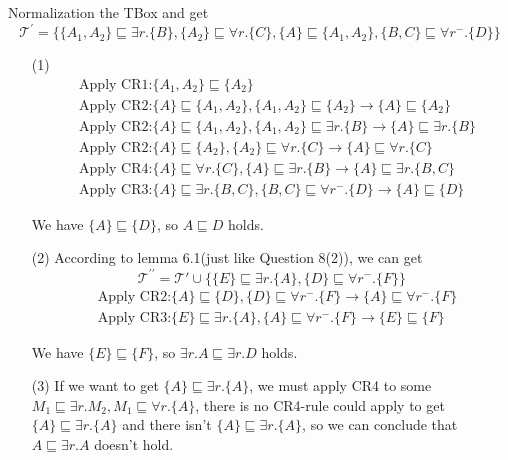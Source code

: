 \documentclass[12pt]{article}
\def \T {\mathcal{T}}
\begin{document}
    Normalization the TBox and get $$\T^{\prime} = \{\{A_1,A_2\}\sqsubseteq \exists r.\{B\},\{A_2\}\sqsubseteq \forall r.\{C\},\{A\} \sqsubseteq\{A_1,A_2\},\{B,C\}\sqsubseteq \forall r^{-}.\{D\}\}$$
    \begin{enumerate}
        \item [(1)]
        \begin{align*}
            &\text{Apply CR1:}\{A_1,A_2\}\sqsubseteq\{A_2\} \\
            &\text{Apply CR2:}\{A\}\sqsubseteq\{A_1,A_2\},\{A_1,A_2\}\sqsubseteq\{A_2\}\to\{A\}\sqsubseteq\{A_2\} \\
            &\text{Apply CR2:}\{A\}\sqsubseteq\{A_1,A_2\},\{A_1,A_2\}\sqsubseteq\exists r.\{B\}\to\{A\}\sqsubseteq\exists r.\{B\} \\
            &\text{Apply CR2:}\{A\}\sqsubseteq\{A_2\},\{A_2\}\sqsubseteq\forall r.\{C\}\to\{A\}\sqsubseteq\forall r.\{C\} \\
            &\text{Apply CR4:}\{A\}\sqsubseteq\forall r.\{C\},\{A\}\sqsubseteq\exists r.\{B\}\to\{A\}\sqsubseteq\exists r.\{B,C\} \\
            &\text{Apply CR3:}\{A\}\sqsubseteq\exists r.\{B,C\},\{B,C\}\sqsubseteq\forall r^{-}.\{D\}\to\{A\}\sqsubseteq\{D\}
            \end{align*} \par
        We have $\{A\} \sqsubseteq \{D\}$, so $A \sqsubseteq D$ holds.
        \item [(2)]
        According to lemma 6.1(just like Question 8(2)), we can get $$\T^{\prime\prime} = \T' \cup\{\{E\} \sqsubseteq \exists r.\{A\},\{D\} \sqsubseteq \forall r^{-}.\{F\}\}$$
        \begin{align*}
            &\text{Apply CR2:}\{A\}\sqsubseteq\{D\},\{D\}\sqsubseteq \forall r^{-}.\{F\} \to \{A\} \sqsubseteq \forall r^{-}.\{F\} \\
            &\text{Apply CR3:}\{E\}\sqsubseteq \exists r.\{A\},\{A\}\sqsubseteq \forall r^{-}.\{F\}\to\{E\}\sqsubseteq\{F\} 
        \end{align*}   \par
        We have $\{E\}\sqsubseteq\{F\}$, so $\exists r . A \sqsubseteq \exists r . D$ holds.
        \item [(3)]
        If we want to get $\{A\} \sqsubseteq \exists r.\{A\}$, we must apply CR4 to some $M_{1} \sqsubseteq \exists r. M_{2} , M_{1} \sqsubseteq \forall r .\{A\}$, there is no CR4-rule could apply to get $\{A\} \sqsubseteq \exists r.\{A\}$ and there isn't $\{A\} \sqsubseteq \exists r.\{A\}$, so we can conclude that $A \sqsubseteq \exists r . A$ doesn't hold.
    \end{enumerate}
\end{document}
